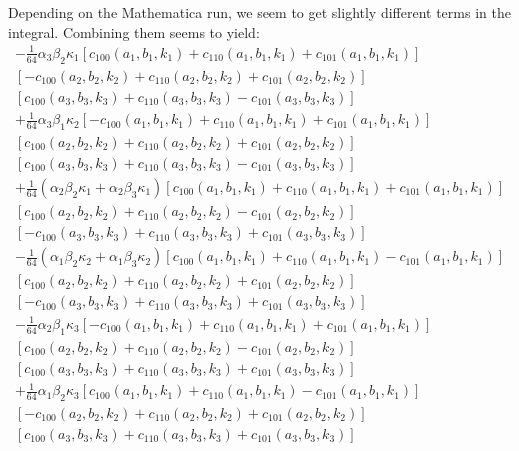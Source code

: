 \documentclass[12pt,onecolumn]{article}
\begin{document}
Depending on the Mathematica run, we seem to get slightly different terms in the integral. Combining them seems to yield:
\begin{equation}
\begin{split}
-\frac{1}{64} \alpha_3 \beta_2 \kappa_1 
   \left[c_{100}(a_1, b_1, k_1) + 
    c_{110}(a_1, b_1, k_1) + 
    c_{101}(a_1, b_1, k_1)\right]\\
   \left[-c_{100}(a_2, b_2, k_2) + 
    c_{110}(a_2, b_2, k_2) + 
    c_{101}(a_2, b_2, k_2)\right]\\
   \left[c_{100}(a_3, b_3, k_3) + 
    c_{110}(a_3, b_3, k_3) - 
    c_{101}(a_3, b_3, k_3)\right] \\ 
+ \frac{1}{64} \alpha_3 \beta_1 \kappa_2 \left[-c_{100}(a_1, b_1, k_1) + c_{110}(a_1, b_1, k_1) + 
    c_{101}(a_1, b_1, k_1)\right]\\ 
   \left[c_{100}(a_2, b_2, k_2) + 
    c_{110}(a_2, b_2, k_2) + 
    c_{101}(a_2, b_2, k_2)\right]\\
   \left[c_{100}(a_3, b_3, k_3) + 
    c_{110}(a_3, b_3, k_3) - 
    c_{101}(a_3, b_3, k_3)\right] \\
+\frac{1}{64} (\alpha_2 \beta_2 \kappa_1 + \alpha_2 \beta_3 \kappa_1) \left[c_{100}(a_1, b_1, k_1) + 
    c_{110}(a_1, b_1, k_1) + 
    c_{101}(a_1, b_1, k_1)\right]\\
   \left[c_{100}(a_2, b_2, k_2) + 
    c_{110}(a_2, b_2, k_2) - 
    c_{101}(a_2, b_2, k_2)\right]\\
   \left[-c_{100}(a_3, b_3, k_3) + 
    c_{110}(a_3, b_3, k_3) + 
    c_{101}(a_3, b_3, k_3)\right] \\
- \frac{1}{64} (\alpha_1 \beta_2 \kappa_2 + \alpha_1 \beta_3 \kappa_2) \left[c_{100}(a_1, b_1, k_1) + 
    c_{110}(a_1, b_1, k_1) - 
    c_{101}(a_1, b_1, k_1)\right]\\
   \left[c_{100}(a_2, b_2, k_2) + 
    c_{110}(a_2, b_2, k_2) + 
    c_{101}(a_2, b_2, k_2)\right]\\
   \left[-c_{100}(a_3, b_3, k_3) + 
    c_{110}(a_3, b_3, k_3) + 
    c_{101}(a_3, b_3, k_3)\right] \\
- \frac{1}{64} \alpha_2 \beta_1 \kappa_3 \left[-c_{100}(a_1, b_1, k_1) + 
 c_{110}(a_1, b_1, k_1) + 
    c_{101}(a_1, b_1, k_1)\right]\\
   \left[c_{100}(a_2, b_2, k_2) + 
    c_{110}(a_2, b_2, k_2) - 
    c_{101}(a_2, b_2, k_2)\right]\\
   \left[c_{100}(a_3, b_3, k_3) + 
    c_{110}(a_3, b_3, k_3) + 
    c_{101}(a_3, b_3, k_3)\right] \\
+ \frac{1}{64} \alpha_1 \beta_2 \kappa_3 \left[c_{100}(a_1, b_1, k_1) + 
    c_{110}(a_1, b_1, k_1) - 
    c_{101}(a_1, b_1, k_1)\right]\\
   \left[-c_{100}(a_2, b_2, k_2) + 
    c_{110}(a_2, b_2, k_2) + 
    c_{101}(a_2, b_2, k_2)\right]\\
   \left[c_{100}(a_3, b_3, k_3) + 
    c_{110}(a_3, b_3, k_3) + 
    c_{101}(a_3, b_3, k_3)\right]
\end{split}
\end{equation}
\end{document}
